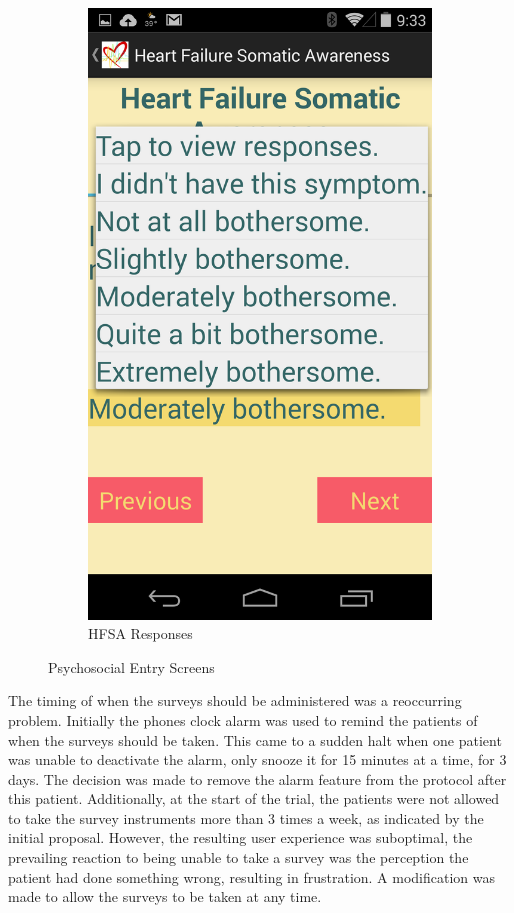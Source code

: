 \begin{figure}[ht]
\begin{subfigure}[b]{0.3\textwidth}
    	\includegraphics[scale=1,width=\textwidth]{Images/HFSA_answer.png}
  		\caption{HFSA Responses}
  		\label{fig:HFSA_R}
  \end{subfigure}
  \caption{Psychosocial Entry Screens} 
  \label{fig:AndroidSurveys}
\end{figure}

The timing of when the surveys should be administered was a reoccurring problem. Initially the phones clock alarm was used to remind the patients of when the surveys should be taken. This came to a sudden halt when one patient was unable to deactivate the alarm, only snooze it for 15 minutes at a time, for 3 days. The decision was made to remove the alarm feature from the protocol after this patient. Additionally, at the start of the trial, the patients were not allowed to take the survey instruments more than 3 times a week, as indicated by the initial proposal. However, the resulting user experience was suboptimal, the prevailing reaction to being unable to take a survey was the perception the patient had done something wrong, resulting in frustration. A modification was made to allow the surveys to be taken at any time.

